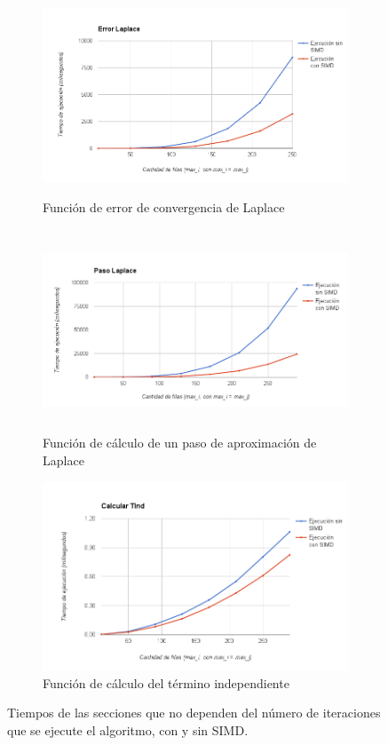 \documentclass[a4paper]{article}
\begin{document}
\begin{figure}
\begin{subfigure}{.5\textwidth}
  \centering
	\hspace{-1.4cm}\includegraphics[height=6cm]{images/LaplaceError.png}
  \caption{Función de error de convergencia de Laplace}
  \label{fig:LaplaceError}
\end{subfigure}%
\begin{subfigure}{.5\textwidth}
  \centering
	\includegraphics[height=6cm, width=1.1\linewidth]{images/LaplaceStep.png}
  \caption{Función de cálculo de un paso de aproximación de Laplace}
  \label{fig:LaplaceStep}
\end{subfigure}

\begin{subfigure}{.5\textwidth}
  \centering
	\includegraphics[width=1.2\linewidth]{images/CalcTInd.png}
  \caption{Función de cálculo del término independiente}
  \label{fig:CalcTInd}
\end{subfigure}

\caption{Tiempos de las secciones que no dependen del número de iteraciones que se ejecute el algoritmo, con y sin SIMD.}
\label{fig:UnicaIter}
\end{figure}
\end{document}
